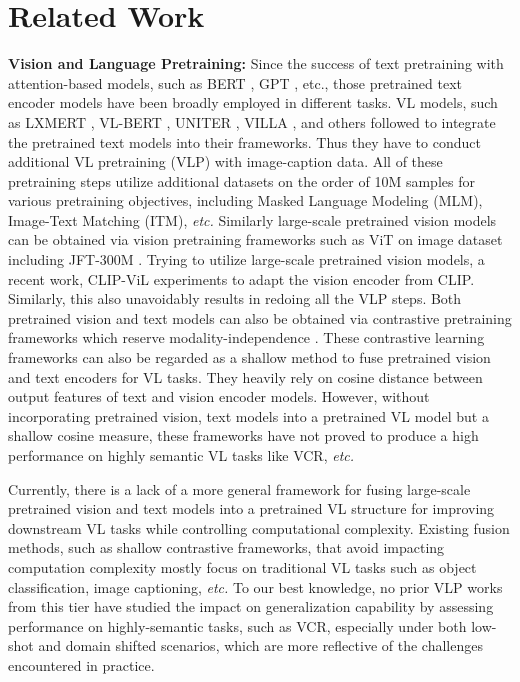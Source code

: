 \documentclass[runningheads]{llncs}
\begin{document}
\section{Related Work}
\textbf{Vision and Language Pretraining: }  Since the success of text pretraining with attention-based models, such as BERT \cite{devlin2018bert}, GPT \cite{radford2019language}, etc., those pretrained text encoder models have been broadly employed in different tasks.  VL models, such as LXMERT \cite{lxmert}, VL-BERT \cite{Su2020VL-BERT}, UNITER \cite{chen2020uniter}, VILLA \cite{gan2020large}, and others \cite{huang2021seeing,huang2020pixel,zhou2020unified,kim2021vilt,yu2020ernie,li2021align} followed to integrate the pretrained text models into their frameworks. Thus they have to conduct additional VL pretraining (VLP) with image-caption data. All of these pretraining steps utilize additional datasets on the order of 10M samples for various pretraining objectives, including Masked Language Modeling (MLM), Image-Text Matching (ITM), \textit{etc.} Similarly large-scale pretrained vision models can be obtained via vision pretraining frameworks such as ViT \cite{dosovitskiy2020image} on image dataset including JFT-300M \cite{sun2017revisiting}. Trying to utilize large-scale pretrained vision models, a recent work, CLIP-ViL experiments to \cite{shen2021clip} adapt the vision encoder from CLIP. Similarly, this also unavoidably results in redoing all the VLP steps. Both pretrained vision and text models can also be obtained via contrastive pretraining frameworks which reserve modality-independence \cite{clip,jia2021scaling,basic}. These contrastive learning frameworks can also be regarded as a shallow method to fuse pretrained vision and text encoders for VL tasks. They heavily rely on cosine distance between output features of text and vision encoder models. However, without incorporating pretrained vision, text models into a pretrained VL model but a shallow cosine measure, these frameworks have not proved to produce a high performance on highly semantic VL tasks like VCR, \textit{etc.}



Currently, there is a lack of a more general framework for fusing large-scale pretrained vision and text models into a pretrained VL structure for improving downstream VL tasks while controlling computational complexity. Existing fusion methods, such as shallow contrastive frameworks, that avoid impacting computation complexity mostly focus on traditional VL tasks such as object classification, image captioning, \textit{etc.} To our best knowledge, no prior VLP works from this tier have studied the impact on generalization capability by assessing performance on highly-semantic tasks, such as VCR, especially under both low-shot and domain shifted scenarios, which are more reflective of the challenges encountered in practice.
\end{document}
